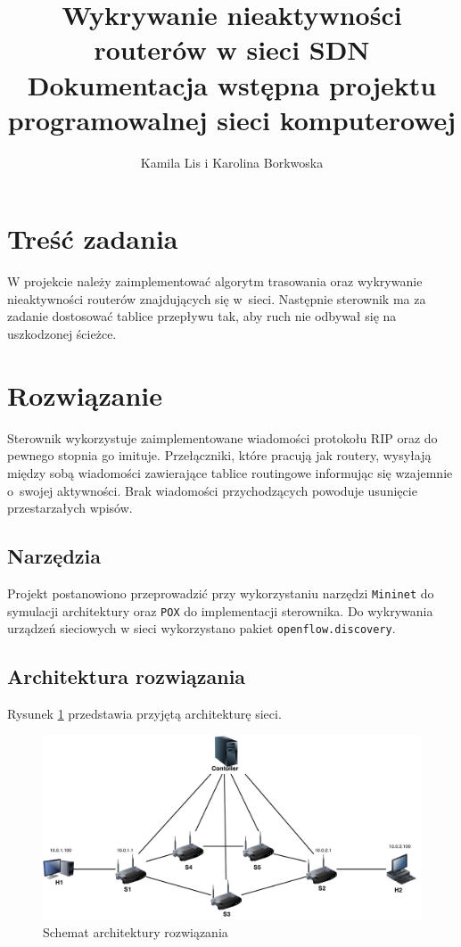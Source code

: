 \documentclass{article}
\date{}
\author{Kamila Lis i Karolina Borkwoska}
\title{Wykrywanie nieaktywności routerów w sieci SDN\\
	{\large Dokumentacja wstępna projektu programowalnej sieci komputerowej}}
\begin{document}
	\maketitle
	\section{Treść zadania}
	W projekcie należy zaimplementować algorytm trasowania oraz wykrywanie nieaktywności routerów znajdujących się w~sieci. Następnie sterownik ma za zadanie dostosować tablice przepływu tak, aby ruch nie odbywał się na uszkodzonej ścieżce.
	\section{Rozwiązanie} 
	Sterownik wykorzystuje zaimplementowane wiadomości protokołu RIP oraz do pewnego stopnia go imituje. Przełączniki, które pracują jak routery, wysyłają między sobą wiadomości zawierające tablice routingowe informując się wzajemnie o~swojej aktywności. Brak wiadomości przychodzących powoduje usunięcie przestarzałych wpisów. 
	\subsection{Narzędzia}
	Projekt postanowiono przeprowadzić przy wykorzystaniu narzędzi \texttt{Mininet} do symulacji architektury oraz \texttt{POX} do implementacji sterownika. Do wykrywania urządzeń sieciowych w sieci wykorzystano pakiet \texttt{openflow.discovery}.
	\subsection{Architektura rozwiązania}
	Rysunek \ref{f:arch} przedstawia przyjętą architekturę sieci. 
	\begin{figure}
		\centering
		\includegraphics[scale = 0.60]{../images/psik_topology_2.pdf}
		\caption{Schemat architektury rozwiązania}
		\label{f:arch}
	\end{figure}
\end{document}
